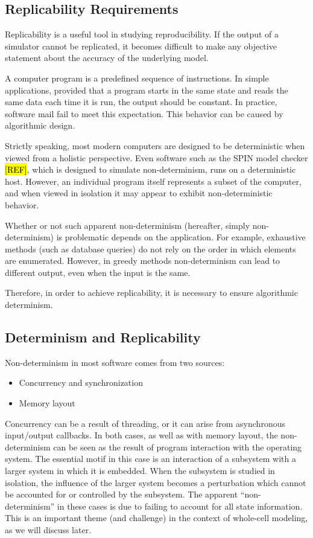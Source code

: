\documentclass[journal,transmag]{IEEEtran}
\begin{document}
\subsection{Replicability Requirements}

Replicability is a useful tool in studying reproducibility.
If the output of a simulator cannot be replicated, it becomes
difficult to make any objective statement about the accuracy of the
underlying model.

A computer program is a predefined sequence of instructions.
In simple applications, provided that a program starts in the same state and reads the same
data each time it is run, the output should be constant.
In practice, software mail fail to meet this expectation.
This behavior can be caused by algorithmic design.

Strictly speaking, most modern computers are designed to be deterministic
when viewed from a holistic perspective.
Even software such as the SPIN model checker \hl{[REF]}, which is designed to
simulate non-determinism, runs on a deterministic host.
However, an individual program itself represents a subset of the computer,
and when viewed in isolation it may appear to exhibit non-deterministic behavior.

Whether or not such apparent non-determinism (hereafter, simply non-determinism)
is problematic depends on the application.
For example, exhaustive methods (such as database queries) do not rely on the order
in which elements are enumerated.
However, in greedy methods non-determinism can lead to different output, even
when the input is the same.

Therefore, in order to achieve replicability, it is necessary to ensure
algorithmic determinism.

\subsection{Determinism and Replicability}

Non-determinism in most software comes from two sources:

\begin{itemize}
\item Concurrency and synchronization
\item Memory layout
\end{itemize}

Concurrency can be a result of threading, or it can arise from
asynchronous input/output callbacks. In both cases, as well as with memory layout,
the non-determinism
can be seen as the result
of program interaction with the operating system.
The essential motif in this case is an interaction of a subsystem
with a larger system in which it is embedded.
When the subsystem is studied in isolation, the influence of the larger
system becomes a perturbation which cannot be accounted for or controlled by
the subsystem. The apparent ``non-determinism'' in these cases
is due to failing to account for all state information.
This is an important theme (and challenge) in the context of whole-cell modeling,
as we will discuss later. %
\end{document}

